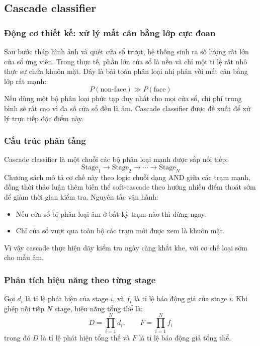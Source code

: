 \subsection{Cascade classifier}

\subsubsection{Động cơ thiết kế: xử lý mất cân bằng lớp cực đoan}

Sau bước tháp hình ảnh và quét cửa sổ trượt, hệ thống sinh ra số lượng rất lớn cửa sổ ứng viên.
Trong thực tế, phần lớn cửa sổ là nền và chỉ một tỉ lệ rất nhỏ thực sự chứa khuôn mặt.
Đây là bài toán phân loại nhị phân với mất cân bằng lớp rất mạnh:
\[
P(\text{non-face}) \gg P(\text{face})
\]
Nếu dùng một bộ phân loại phức tạp duy nhất cho mọi cửa sổ, chi phí trung bình sẽ rất cao vì đa số cửa sổ đều là âm.
Cascade classifier được đề xuất để xử lý trực tiếp đặc điểm này.  \cite{viola2001rapid,viola2004robust}

\subsubsection{Cấu trúc phân tầng}

Cascade classifier là một chuỗi các bộ phân loại mạnh được sắp nối tiếp:
\[
\text{Stage}_1 \rightarrow \text{Stage}_2 \rightarrow \cdots \rightarrow \text{Stage}_N
\]
Chương sách mô tả cơ chế này theo logic chuỗi dạng AND giữa các trạm mạnh, đồng thời thảo luận thêm biến thể soft-cascade theo hướng nhiều điểm thoát sớm để giảm thời gian kiểm tra.  \cite{li2012facechapter}
Nguyên tắc vận hành:
\begin{itemize}
  \item Nếu cửa sổ bị phân loại âm ở bất kỳ trạm nào thì dừng ngay.
  \item Chỉ cửa sổ vượt qua toàn bộ các trạm mới được xem là khuôn mặt.
\end{itemize}
Vì vậy cascade thực hiện dãy kiểm tra ngày càng khắt khe, với cơ chế loại sớm cho mẫu âm.

\subsubsection{Phân tích hiệu năng theo từng stage}

Gọi $d_i$ là tỉ lệ phát hiện của stage $i$, và $f_i$ là tỉ lệ báo động giả của stage $i$.
Khi ghép nối tiếp $N$ stage, hiệu năng tổng thể là:
\[
D=\prod_{i=1}^{N} d_i,\qquad
F=\prod_{i=1}^{N} f_i
\]
trong đó $D$ là tỉ lệ phát hiện tổng thể và $F$ là tỉ lệ báo động giả tổng thể.

